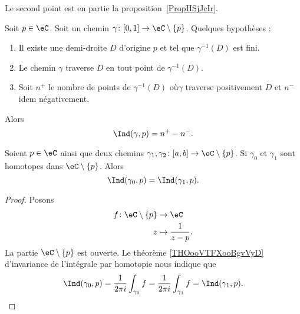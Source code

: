 Le second point est en partie la proposition~\ref{PropHSjJcIr}.

\begin{proposition}     \label{PROPooXWULooFZgHfL}
    Soit \( p\in \eC\). Soit un chemin \( \gamma\colon \mathopen[ 0 , 1 \mathclose]\to \eC\setminus\{ p \}\). Quelques hypothèses :
    \begin{enumerate}
            \item
                Il existe une demi-droite \( D\) d'origine \( p\) et tel que \( \gamma^{-1}(D)\) est fini.
                \item
                    Le chemin \( \gamma\) traverse \( D\) en tout point de \( \gamma^{-1}(D)\).
            \item
                Soit \( n^+\) le nombre de points de \( \gamma^{-1}(D)\) où\( \gamma\) traverse positivement \( D\) et \( n^-\) idem négativement.
        \end{enumerate}
        Alors
        \begin{equation}
            \Ind(\gamma,p)=n^+-n^-.
        \end{equation}
\end{proposition}

\begin{proposition}       \label{PROPooEKFHooOWcIMk}
    Soient \( p\in \eC\) ainsi que deux chemins \( \gamma_1,\gamma_2\colon \mathopen[ a , b \mathclose]\to \eC\setminus \{ p \} \). Si \( \gamma_0\) et \( \gamma_1\) sont homotopes dans \( \eC\setminus \{ p \}\). Alors
    \begin{equation}
        \Ind(\gamma_0,p)=\Ind(\gamma_1,p).
    \end{equation}
\end{proposition}

\begin{proof}
    Posons 
    \begin{equation}
        \begin{aligned}
            f\colon \eC\setminus\{ p \}&\to \eC \\
            z&\mapsto \frac{1}{ z-p } .
        \end{aligned}
    \end{equation}
    La partie \( \eC\setminus\{ p \}\) est ouverte. Le théorème \ref{THOooVTFXooBgvVyD} d'invariance de l'intégrale par homotopie nous indique que
    \begin{equation}
        \Ind(\gamma_0,p)=\frac{1}{ 2\pi i }\int_{\gamma_0}f=\frac{1}{ 2\pi i }\int_{\gamma_1}f=\Ind(\gamma_1,p).
    \end{equation}
\end{proof}

